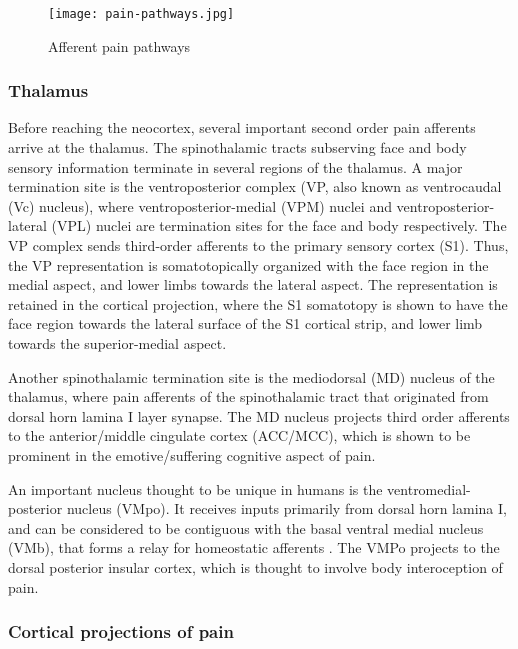  \begin{figure}[ht]
 \texttt{[image: pain-pathways.jpg]}
 \centering
 \caption{Afferent pain pathways \protect\cite{kandel2000principles}}
 \label{fig:pain-pathways}
 \end{figure}
 
 
\subsubsection{Thalamus}

Before reaching the neocortex, several important second order pain afferents arrive at the thalamus. The spinothalamic tracts subserving face and body sensory information terminate in several regions of the thalamus. A major termination site is the ventroposterior complex (VP, also known as ventrocaudal (Vc) nucleus), where ventroposterior-medial (VPM) nuclei and ventroposterior-lateral (VPL) nuclei are termination sites for the face and body respectively. The VP complex sends third-order afferents to the primary sensory cortex (S1). Thus, the VP representation is somatotopically organized with the face region in the medial aspect, and lower limbs towards the lateral aspect. The representation is retained in the cortical projection, where the S1 somatotopy is shown to have the face region towards the lateral surface of the S1 cortical strip, and lower limb towards the superior-medial aspect. 

Another spinothalamic termination site is the mediodorsal (MD) nucleus of the thalamus, where pain afferents of the spinothalamic tract that originated from dorsal horn lamina I layer synapse. The MD nucleus projects third order afferents to the anterior/middle cingulate cortex (ACC/MCC), which is shown to be prominent in the emotive/suffering cognitive aspect of pain.  

An important nucleus thought to be unique in humans is the ventromedial-posterior nucleus (VMpo)\cite{Willis2002,Craig2014}. It receives inputs primarily from dorsal horn lamina I, and can be considered to be contiguous with the basal ventral medial nucleus (VMb), that forms a relay for homeostatic afferents \cite{Craig2003}. The VMPo projects to the dorsal posterior insular cortex, which is thought to involve body interoception of pain.

\subsubsection{Cortical projections of pain}\label{section:neuromatrix}

